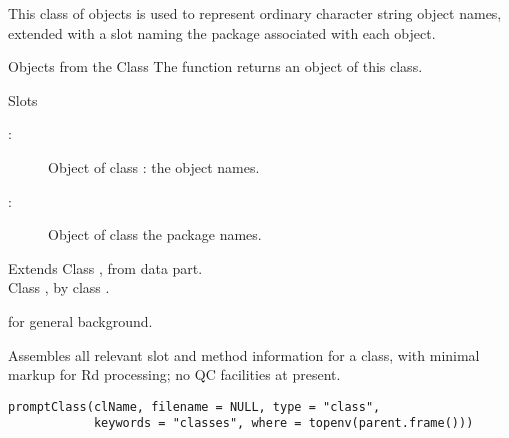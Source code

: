 %
\begin{Description}\relax
This class of objects is used to represent ordinary character string
object names, extended with a  slot naming the package
associated with each object.
\end{Description}
%
\begin{Section}{Objects from the Class}
The function  returns an object of this class.
\end{Section}
%
\begin{Section}{Slots}
\begin{description}

\item[:] Object of class : the
object names.
\item[:] Object of class  the
package names.

\end{description}

\end{Section}
%
\begin{Section}{Extends}
Class , from data part.\\{}
Class , by class .
\end{Section}
%
\begin{SeeAlso}\relax
  for general background. 
\end{SeeAlso}
%
\begin{Description}\relax
Assembles all relevant slot and method information for a class, with
minimal markup for Rd processing; no QC facilities at present.
\end{Description}
%
\begin{Usage}
\begin{verbatim}
promptClass(clName, filename = NULL, type = "class",
            keywords = "classes", where = topenv(parent.frame()))
\end{verbatim}
\end{Usage}
%
